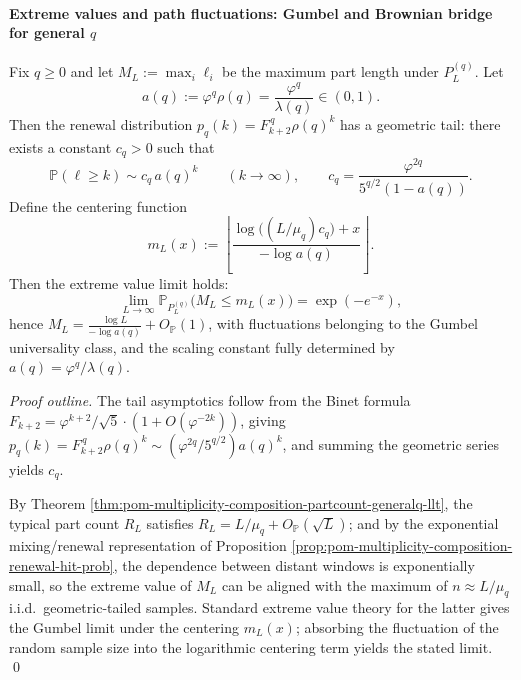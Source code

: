 \paragraph{Extreme values and path fluctuations: Gumbel and Brownian bridge for general \texorpdfstring{$q$}{q}}
\begin{theorem}\label{thm:pom-multiplicity-composition-maxpart-gumbel-generalq}
Fix \(q\ge 0\) and let \(M_L:=\max_i \ell_i\) be the maximum part length under \(P_L^{(q)}\).
Let
\[
a(q):=\varphi^{q}\rho(q)=\frac{\varphi^{q}}{\lambda(q)}\in(0,1).
\]
Then the renewal distribution \(p_q(k)=F_{k+2}^{\,q}\rho(q)^k\) has a geometric tail: there exists a constant \(c_q>0\) such that
\[
\mathbb{P}(\ell\ge k)\sim c_q\,a(q)^k\qquad(k\to\infty),
\qquad
c_q=\frac{\varphi^{2q}}{5^{q/2}(1-a(q))}.
\]
Define the centering function
\[
m_L(x):=\left\lfloor \frac{\log\!\bigl((L/\mu_q)c_q\bigr)+x}{-\log a(q)}\right\rfloor .
\]
Then the extreme value limit holds:
\[
\lim_{L\to\infty}\mathbb{P}_{P_L^{(q)}}\bigl(M_L\le m_L(x)\bigr)=\exp(-e^{-x}),
\]
hence
\(
M_L=\frac{\log L}{-\log a(q)}+O_{\mathbb{P}}(1)
\), with fluctuations belonging to the Gumbel universality class, and the scaling constant fully determined by \(a(q)=\varphi^{q}/\lambda(q)\).
\end{theorem}
\begin{proof}[Proof outline]
The tail asymptotics follow from the Binet formula \(F_{k+2}=\varphi^{k+2}/\sqrt5\cdot(1+O(\varphi^{-2k}))\), giving
\(
p_q(k)=F_{k+2}^{\,q}\rho(q)^k\sim (\varphi^{2q}/5^{q/2})a(q)^k
\), and summing the geometric series yields \(c_q\).
\par
By Theorem \ref{thm:pom-multiplicity-composition-partcount-generalq-llt},
the typical part count \(R_L\) satisfies \(R_L=L/\mu_q+O_{\mathbb{P}}(\sqrt{L})\);
and by the exponential mixing/renewal representation of Proposition \ref{prop:pom-multiplicity-composition-renewal-hit-prob},
the dependence between distant windows is exponentially small, so the extreme value of \(M_L\) can be aligned with the maximum of \(n\approx L/\mu_q\) i.i.d.\ geometric-tailed samples.
Standard extreme value theory for the latter gives the Gumbel limit under the centering \(m_L(x)\); absorbing the fluctuation of the random sample size into the logarithmic centering term yields the stated limit. \qed
\end{proof}
